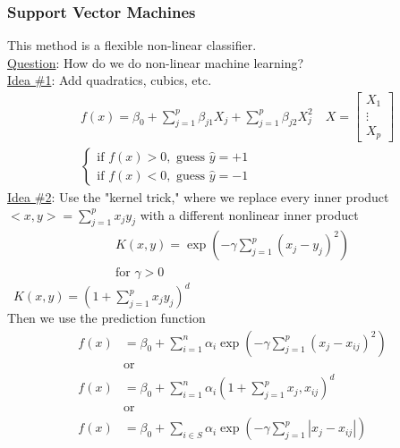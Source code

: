 \documentclass[12pt, letterpaper]{article}
\begin{document}
\subsubsection{Support Vector Machines}
This method is a flexible non-linear classifier. \\
\underline{Question}: How do we do non-linear machine learning? \\
\underline{Idea \#1}: Add quadratics, cubics, etc.
\begin{align*}
    &f(x) = \beta_0 + \sum_{j=1}^{p}\beta_{j1}X_j + \sum_{j=1}^{p}\beta_{j2}X^2_j \quad X = \begin{bmatrix}
        X_1 \\ \vdots \\ X_p
    \end{bmatrix} \\
    &\begin{cases}
        \text{if } f(x)>0, \text{ guess } \hat y = +1 \\
        \text{if } f(x)<0, \text{ guess } \hat y = -1 
    \end{cases}
\end{align*}
\underline{Idea \#2}: Use the "kernel trick," where we replace every inner product $<x,y> = \sum_{j=1}^{p}x_jy_j$ 
with a different nonlinear inner product 
\begin{align*}
    K(x,y) = \exp(-\gamma \sum_{j=1}^{p}(x_j-y_j)^2) \\
    \text{for } \gamma > 0
\end{align*}
\ $K(x,y) = (1 + \sum_{j=1}^{p}x_jy_j)^d$ \\
Then we use the prediction function 
\begin{align*}
    f(x) &= \beta_0 + \sum_{i=1}^{n} \alpha_i \exp(-\gamma \sum_{j=1}^{p}(x_j - x_{ij})^2) \\
    &\text{or} \\ 
    f(x) &= \beta_0 + \sum_{i=1}^{n} \alpha_i (1+\sum_{j=1}^{p} x_j, x_{ij})^d  \\
    &\text{or} \\
    f(x) &= \beta_0 + \sum_{i\in S} \alpha_i \exp(-\gamma \sum_{j=1}^{p} |x_j-x_{ij}|)
\end{align*}
\end{document}
